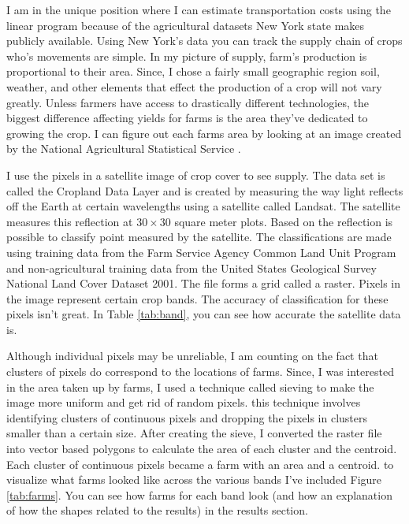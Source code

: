 \documentclass{report}
\begin{document}
I am in the unique position where I can estimate transportation costs using the linear program because of the agricultural datasets New York state makes publicly available. Using New York's data you can track the supply chain of crops who's movements are simple. In my picture of supply, farm's production is proportional to their area. Since, I chose a fairly small geographic region soil, weather, and other elements that effect the production of a crop will not vary greatly. Unless farmers have access to drastically different technologies, the biggest difference affecting yields for farms is the area they've dedicated to growing the crop. I can figure out each farms area by looking at an image created by the National Agricultural Statistical Service \cite{nass}.

I use the pixels in a satellite image of crop cover to see supply. The data set is called the Cropland Data Layer and is created by measuring the way light reflects off the Earth at certain wavelengths using a satellite called Landsat. The satellite measures this reflection at $30 \times 30$ square meter plots. Based on the reflection is possible to classify point measured by the satellite. The classifications are made using training data from the Farm Service Agency Common Land Unit Program and non-agricultural training data from the United States Geological Survey National Land Cover Dataset 2001. The file forms a grid called a raster. Pixels in the image represent certain crop bands. The accuracy of classification for these pixels isn't great. In Table \ref{tab:band}, you can see how accurate the satellite data is.

Although individual pixels may be unreliable, I am counting on the fact that clusters of pixels do  correspond to the locations of farms. Since, I was interested in the area taken up by farms, I used a technique called sieving to make the image more uniform and get rid of random pixels. this technique involves identifying clusters of continuous pixels and dropping the pixels in clusters smaller than a certain size. After creating the sieve, I converted the raster file into vector based polygons to calculate the area of each cluster and the centroid. Each cluster of continuous pixels became a farm with an area and a centroid. to visualize what farms looked like across the various bands I've included Figure \ref{tab:farms}. You can see how farms for each band look (and how an explanation of how the shapes related to the results) in the results section.
\end{document}
